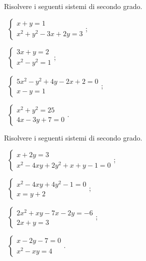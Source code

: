\begin{esercizio}[\Ast]
 \label{ese:6.4}
Risolvere i seguenti sistemi di secondo grado.
\begin{multicols}{2}
 \begin{enumeratea}
 \item~$\left\{\begin{array}{l}x+y=1\\x^2+y^2-3x+2y=3\end{array}\right.$;
 \item~$\left\{\begin{array}{l}3x+y=2\\x^2-y^2=1\end{array}\right.$;
 \item~$\left\{\begin{array}{l}5x^2-y^2+4y-2x+2=0\\x-y=1\end{array}\right.$;
 \item~$\left\{\begin{array}{l}x^2+y^2=25\\4x-3y+7=0\end{array}\right.$.
 \end{enumeratea}
 \end{multicols}
\end{esercizio}

\begin{esercizio}[\Ast]
\label{ese:6.5}
Risolvere i seguenti sistemi di secondo grado.
\begin{multicols}{2}
 \begin{enumeratea}
 \item~$\left\{\begin{array}{l}x+2y=3\\x^2-4xy+2y^2+x+y-1=0\end{array}\right.$;
 \item~$\left\{\begin{array}{l}x^2-4xy+4y^2-1=0\\x=y+2\end{array}\right.$;
 \item~$\left\{\begin{array}{l}2x^2+xy-7x-2y=-6\\2x+y=3\end{array}\right.$;
 \item~$\left\{\begin{array}{l}x-2y-7=0\\x^2-xy=4\end{array}\right.$.
 \end{enumeratea}
 \end{multicols}
\end{esercizio}

